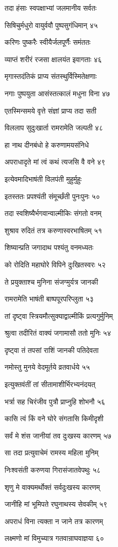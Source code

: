 तदा हंसाः स्वपक्षाभ्यां जलमानीय सर्वतः

सिषिचुर्मधुरो वायुर्ववौ पुष्पसुगंधिमान् ४५

करिणः पुष्करैः स्वीयैर्जलपूर्णैः समंततः

व्याप्तं शरीरं रजसा क्षालयंत इवागताः ४६

मृगास्तदंतिकं प्राप्य संतस्थुर्विस्मितेक्षणाः

नगाः पुष्पयुता आसंस्तत्कालं मधुना विना ४७

एतस्मिन्समये वृत्ते संज्ञां प्राप्य तदा सती

विललाप सुदुःखार्ता रामरामेति जल्पती ४८

हा नाथ दीनबंधो हे करुणामयसंनिधे

अपराधादृते मां त्वं कथं त्यजसि वै वने ४९

इत्येवमादिभाषंती विलपंती मुहुर्मुहुः

इतस्ततः प्रपश्यंती संमूर्च्छंती पुनःपुनः ५०

तदा स्वशिष्यैर्भगवान्वाल्मीकिः संगतो वनम्

शुश्राव रुदितं तत्र करुणास्वरभाषितम् ५१

शिष्यान्प्रति जगादाथ पश्यंतु वनमध्यतः

को रोदिति महाघोरे विपिने दुःखितस्वरः ५२

ते प्रयुक्ताश्च मुनिना संजग्मुर्यत्र जानकी

रामरामेति भाषंती बाष्पपूरपरिप्लुता ५३

तां दृष्ट्वा स्त्रियमौत्सुक्याद्वाल्मीकिं प्रत्यगुर्मुनिम्

श्रुत्वा तदीरितं वाक्यं जगामासौ ततो मुनिः ५४

दृष्ट्वा तं तपसां राशिं जानकी पतिदेवता

नमोस्तु मुनये वेदमूर्तये व्रतवार्धये ५५

इत्युक्तवंतीं तां सीतामाशीर्भिरभ्यनंदयत्

भर्त्रा सह चिरंजीव पुत्रौ प्राप्नुहि शोभनौ ५६

कासि त्वं किं वने घोरे संगतासि किमीदृशी

सर्वं मे शंस जानीयां तव दुःखस्य कारणम् ५७

सा तदा प्रत्युवाचेमं रामस्य महिला मुनिम्

निःश्वसंती करुणया गिरासंजातवेपथुः ५८

शृणु मे वाक्यमर्थोक्तं सर्वदुःखस्य कारणम्

जानीहि मां भूमिपते रघुनाथस्य सेवकीम् ५९

अपराधं विना त्यक्ता न जाने तत्र कारणम्

लक्ष्मणो मां विमुच्यात्र गतवान्राघवाज्ञया ६०

